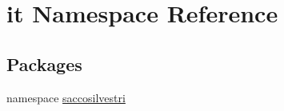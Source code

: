 \hypertarget{namespaceit}{
\section{it \-Namespace \-Reference}
\label{namespaceit}
}
\subsection*{\-Packages}
\begin{DoxyCompactItemize}
\item 
namespace \hyperlink{namespaceit_1_1saccosilvestri}{saccosilvestri}
\end{DoxyCompactItemize}
